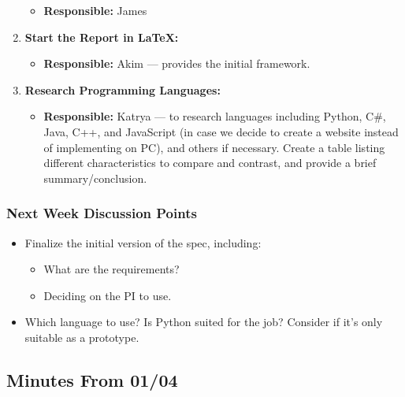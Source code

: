 \documentclass[12pt]{article}
\begin{document}
\begin{enumerate}
  \begin{itemize}
  \tightlist
  \item
    \textbf{Responsible:} James
  \end{itemize}
\item
  \textbf{Start the Report in LaTeX:}

  \begin{itemize}
  \tightlist
  \item
    \textbf{Responsible:} Akim --- provides the initial framework.
  \end{itemize}
\item
  \textbf{Research Programming Languages:}

  \begin{itemize}
  \tightlist
  \item
    \textbf{Responsible:} Katrya --- to research languages including
    Python, C\#, Java, C++, and JavaScript (in case we decide to create
    a website instead of implementing on PC), and others if necessary.
    Create a table listing different characteristics to compare and
    contrast, and provide a brief summary/conclusion.
  \end{itemize}
\end{enumerate}

\hypertarget{next-week-discussion-points}{%
\subsubsection{Next Week Discussion
Points}\label{next-week-discussion-points}}

\begin{itemize}
\tightlist
\item
  Finalize the initial version of the spec, including:

  \begin{itemize}
  \tightlist
  \item
    What are the requirements?
  \item
    Deciding on the PI to use.
  \end{itemize}
\item
  Which language to use? Is Python suited for the job? Consider if it's
  only suitable as a prototype.
\end{itemize}

\hypertarget{minutes-from-0104}{%
\subsection{Minutes From 01/04}\label{minutes-from-0104}}
\end{document}
